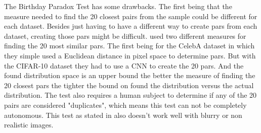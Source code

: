 The Birthday Paradox Test has some drawbacks.
The first being that the measure needed to find the 20 closest pairs from the sample could be different for each dataset.
Besides just having to have a different way to create pars from each dataset, creating those pars might be difficult.
\cite{arora2018gans} used two different measures for finding the 20 most similar pars.
The first being for the CelebA dataset in which they simple used a Euclidean distance in pixel space to determine pars.
But with the CIFAR-10 dataset they had to use a CNN to create the 20 pars.
And the found distribution space is an upper bound the better the measure of finding the 20 closest pars the tighter the bound on found the distribution versus the actual distribution.
The test also requires a human subject to determine if any of the 20 pairs are considered "duplicates", which means this test can not be completely autonomous. This test as stated in \cite{arora2018gans} also doesn't work well with blurry or non realistic images. 